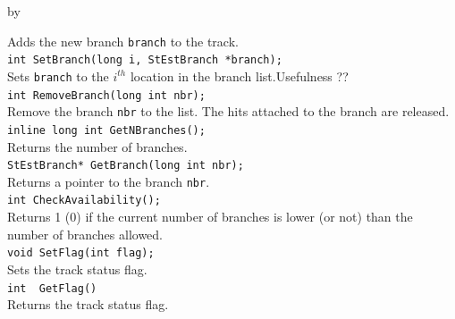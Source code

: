 \documentclass[twoside]{article}
\newcommand{\entrylabel}[1]{\mbox{\textbf{{#1}}}\hfil}%
\newenvironment{entry}
{\begin{list}{}%
    {\renewcommand{\makelabel}{\entrylabel}%
     \setlength{\labelwidth}{90pt}%
     \setlength{\leftmargin}{\labelwidth}
     \advance\leftmargin by \labelsep%
      }%
    }%
  {\end{list}}
\newcommand{\Entrylabel}[1]%
{\raisebox{0pt}[1ex][0pt]{\makebox[\labelwidth][l]%
    {\parbox[t]{\labelwidth}{\hspace{0pt}\textbf{{#1}}}}}}
\newenvironment{Entry}%
{\renewcommand{\entrylabel}{\Entrylabel}\begin{entry}}%
  {\end{entry}}
\begin{document}
\begin{Entry}
	Adds the new branch \verb+branch+ to the track.\\	
	\verb+int SetBranch(long i, StEstBranch *branch);+\\
	Sets \verb+branch+ to the $i^{th}$ location in the branch list.Usefulness ??\\
	\verb+int RemoveBranch(long int nbr);+\\
	Remove the branch \verb+nbr+ to the list. The hits attached to the branch are released.\\
	\verb+inline long int GetNBranches();+\\
	Returns the number of branches.\\
	\verb+StEstBranch* GetBranch(long int nbr);+\\
	Returns a pointer to the branch \verb+nbr+.\\
	\verb+int CheckAvailability();+\\
	Returns 1 (0) if the current number of branches is lower (or not) than the number of branches allowed.\\
	\verb+void SetFlag(int flag);+\\
	Sets the track status flag.\\
	\verb+int  GetFlag()+\\
	Returns the track status flag.\\
\end{Entry}
%
%
\end{document}
